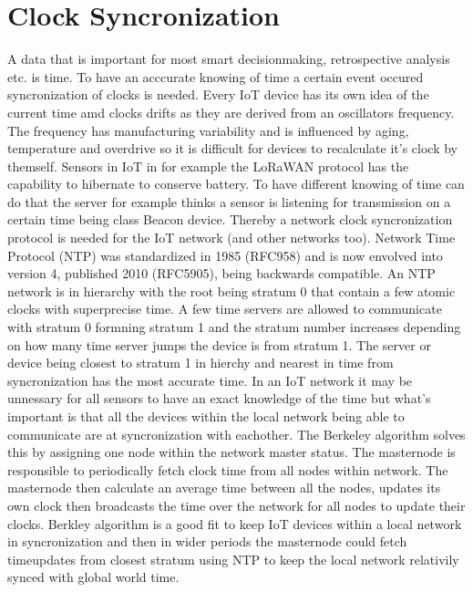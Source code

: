 \documentclass[article,a4paper]{IEEEtran}
\begin{document}
\section{Clock Syncronization}
A data that is important for most smart decisionmaking, retrospective analysis etc. is time. To have an acccurate knowing of time a certain event occured syncronization of clocks is needed. Every IoT device has its own idea of the current time amd clocks drifts as they are derived from an oscillators frequency. The frequency has manufacturing variability and is influenced by aging, temperature and overdrive so it is difficult for devices to recalculate it's clock by themself. Sensors in IoT in for example the LoRaWAN protocol has the capability to hibernate to conserve battery. To have different knowing of time can do that the server for example thinks a sensor is listening for transmission on a certain time being class Beacon device. Thereby a network clock syncronization protocol is needed for the IoT network (and other networks too). 
\newline\newline 
\cite{NTPv4}Network Time Protocol (NTP) was standardized in 1985 (RFC958) and is now envolved into version 4, published 2010 (RFC5905), being backwards compatible. An NTP network is in hierarchy with the root being stratum 0 that contain a few atomic clocks with superprecise time. A few time servers are allowed to communicate with stratum 0 formning stratum 1 and the stratum number increases depending on how many time server jumps the device is from stratum 1. The server or device being closest to stratum 1 in hierchy and nearest in time from syncronization has the most accurate time. In an IoT network it may be unnessary for all sensors to have an exact knowledge of the time but what's important is that all the devices within the local network being able to communicate are at syncronization with eachother. 
\newline\newline
The Berkeley algorithm \cite{Berkleyalgo} solves this by assigning one node within the network master status. The masternode is responsible to periodically fetch clock time from all nodes within network. The masternode then calculate an average time between all the nodes, updates its own clock then broadcasts the time over the network for all nodes to update their clocks. Berkley algorithm is a good fit to keep IoT devices within a local network in syncronization and then in wider periods the masternode could fetch timeupdates from closest stratum using NTP to keep the local network relativily synced with global world time.  
\end{document}
